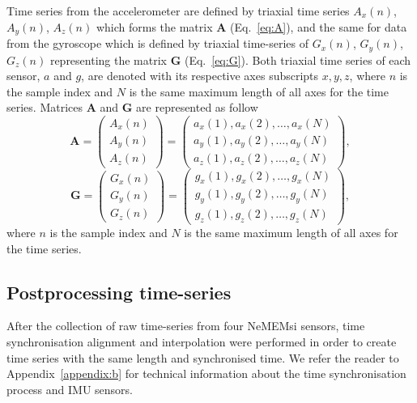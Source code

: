 Time series from the accelerometer are defined by triaxial time series 
$A_x(n)$, $A_y(n)$, $A_z(n)$ which forms the matrix $\boldsymbol{A}$ 
(Eq.~\ref{eq:A}), and the same for data from the gyroscope which is 
defined by triaxial time-series of $G_x(n)$, $G_y(n)$, $G_z(n)$ representing 
the matrix $\boldsymbol{G}$ (Eq.~\ref{eq:G}). Both triaxial time series of 
each sensor, $a$ and $g$, are denoted with its respective axes 
subscripts $x,y,z$, where $n$ is the sample index  and $N$ is the same 
maximum length of all axes for the time series.
Matrices  $\boldsymbol{A}$ and $\boldsymbol{G}$ are represented as follow
\begin{equation}\label{eq:A}
\boldsymbol{A} =
\begin{pmatrix}
  A_x(n) \\
  A_y(n) \\
  A_z(n)
\end{pmatrix}
=
\begin{pmatrix}
 a_x(1),a_x(2),\dots,a_x(N) \\
 a_y(1),a_y(2),\dots,a_y(N) \\
 a_z(1),a_z(2),\dots,a_z(N) 
\end{pmatrix},
\end{equation}
\begin{equation}\label{eq:G}
\boldsymbol{G} =
\begin{pmatrix}
 G_x(n) \\
 G_y(n) \\
 G_z(n)
\end{pmatrix}
=
\begin{pmatrix}
 g_x(1),g_x(2),\dots,g_x(N) \\
 g_y(1),g_y(2),\dots,g_y(N) \\
 g_z(1),g_z(2),\dots,g_z(N) 
\end{pmatrix},
\end{equation}
where $n$ is the sample index  and $N$ is the same maximum length of all axes 
for the time series.


\subsection{Postprocessing time-series}
After the collection of raw time-series from four NeMEMsi sensors,
time synchronisation alignment and interpolation were performed 
in order to create time series with the same length and synchronised time.
We refer the reader to Appendix~\ref{appendix:b} for technical information 
about the time synchronisation process and IMU sensors.

